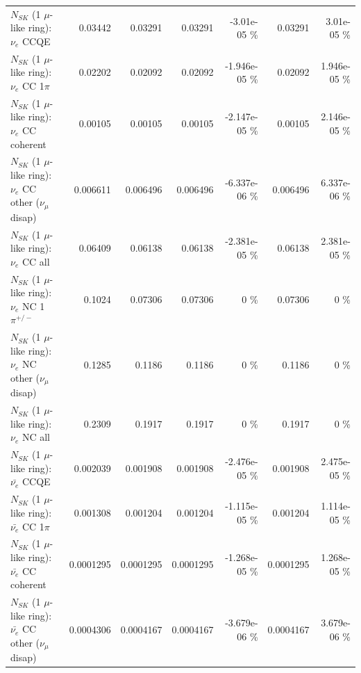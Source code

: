 \begin{table}
\begin{tabular}{| l | r | r | r  r | r  r |}
\hline
\hline
\hline
                                      $N_{SK}$ (1 $\mu$-like ring): $\nu_e$ CCQE &         0.03442 &         0.03291 &         0.03291 & -3.01e-05 \%  &         0.03291 & 3.01e-05 \%  \\ 
                                 $N_{SK}$ (1 $\mu$-like ring): $\nu_e$ CC 1$\pi$ &         0.02202 &         0.02092 &         0.02092 & -1.946e-05 \%  &         0.02092 & 1.946e-05 \%  \\ 
                               $N_{SK}$ (1 $\mu$-like ring): $\nu_e$ CC coherent &         0.00105 &         0.00105 &         0.00105 & -2.147e-05 \%  &         0.00105 & 2.146e-05 \%  \\ 
                $N_{SK}$ (1 $\mu$-like ring): $\nu_e$ CC other ($\nu_\mu$ disap) &        0.006611 &        0.006496 &        0.006496 & -6.337e-06 \%  &        0.006496 & 6.337e-06 \%  \\ 
                                  $N_{SK}$ (1 $\mu$-like ring): $\nu_{e}$ CC all &         0.06409 &         0.06138 &         0.06138 & -2.381e-05 \%  &         0.06138 & 2.381e-05 \%  \\ 
\hline
                           $N_{SK}$ (1 $\mu$-like ring): $\nu_e$ NC 1$\pi^{+/-}$ &          0.1024 &         0.07306 &         0.07306 &        0 \%  &         0.07306 &        0 \%  \\ 
                $N_{SK}$ (1 $\mu$-like ring): $\nu_e$ NC other ($\nu_\mu$ disap) &          0.1285 &          0.1186 &          0.1186 &        0 \%  &          0.1186 &        0 \%  \\ 
                                  $N_{SK}$ (1 $\mu$-like ring): $\nu_{e}$ NC all &          0.2309 &          0.1917 &          0.1917 &        0 \%  &          0.1917 &        0 \%  \\ 
\hline
\hline
\hline
                                $N_{SK}$ (1 $\mu$-like ring): $\bar{\nu_e}$ CCQE &        0.002039 &        0.001908 &        0.001908 & -2.476e-05 \%  &        0.001908 & 2.475e-05 \%  \\ 
                           $N_{SK}$ (1 $\mu$-like ring): $\bar{\nu_e}$ CC 1$\pi$ &        0.001308 &        0.001204 &        0.001204 & -1.115e-05 \%  &        0.001204 & 1.114e-05 \%  \\ 
                         $N_{SK}$ (1 $\mu$-like ring): $\bar{\nu_e}$ CC coherent &       0.0001295 &       0.0001295 &       0.0001295 & -1.268e-05 \%  &       0.0001295 & 1.268e-05 \%  \\ 
          $N_{SK}$ (1 $\mu$-like ring): $\bar{\nu_e}$ CC other ($\nu_\mu$ disap) &       0.0004306 &       0.0004167 &       0.0004167 & -3.679e-06 \%  &       0.0004167 & 3.679e-06 \%  \\ 

\end{tabular}
\end{table}
